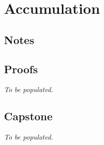 \chapter{Accumulation}

\clearpage
\section{Notes}

\clearpage

\section{Proofs}
\textit{To be populated.}

\section{Capstone}
\textit{To be populated.}

